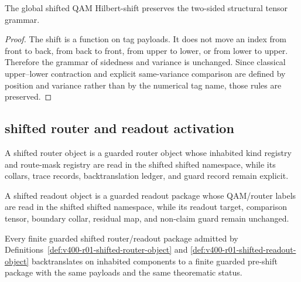 \begin{theorem}
\label{thm:v400-r01-shifted-tensor-grammar-preservation}
The global shifted QAM Hilbert-shift preserves the two-sided structural tensor
grammar.
\end{theorem}

\begin{proof}
The shift is a function on tag payloads. It does not move an index from front
to back, from back to front, from upper to lower, or from lower to upper.
Therefore the grammar of sidedness and variance is unchanged. Since classical
upper--lower contraction and explicit same-variance comparison are defined by
position and variance rather than by the numerical tag name, those rules are
preserved.
\end{proof}

\subsection{shifted router and readout activation}
\label{subsec:v400-r01-router-readout-activation}

\begin{definition}
\label{def:v400-r01-shifted-router-object}
A shifted router object is a guarded router object whose inhabited kind registry and
route-mask registry are read in the shifted shifted namespace, while its collars,
trace records, backtranslation ledger, and guard record remain explicit.
\end{definition}

\begin{definition}
\label{def:v400-r01-shifted-readout-object}
A shifted readout object is a guarded readout package whose QAM/router labels are
read in the shifted shifted namespace, while its readout target, comparison tensor,
boundary collar, residual map, and non-claim guard remain unchanged.
\end{definition}

\begin{theorem}
\label{thm:v400-r01-shifted-activation-conservativity}
Every finite guarded shifted router/readout package admitted by
Definitions~\ref{def:v400-r01-shifted-router-object} and
\ref{def:v400-r01-shifted-readout-object} backtranslates on inhabited components to
a finite guarded pre-shift package with the same payloads and the same theorematic
status.
\end{theorem}

